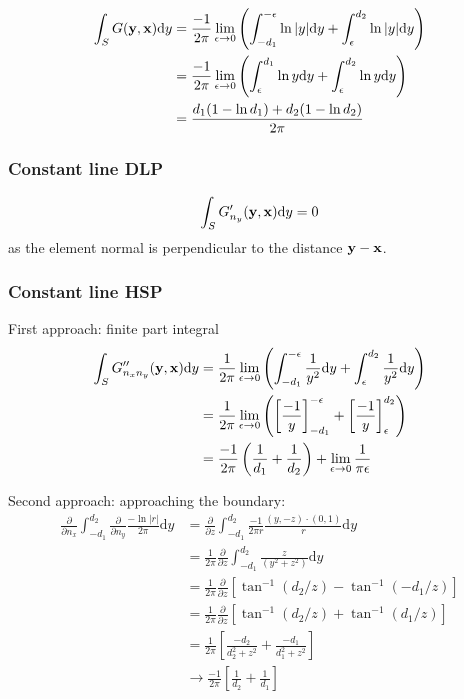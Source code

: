 \documentclass[a4paper,11pt]{article}
\newcommand{\td}{\mathrm{d}}
\begin{document}
\begin{align}
\int_{S} G({\bf y}, {\bf x}) \td y
& = \frac{-1}{2\pi}\lim_{\epsilon \to 0}
\left( \int_{-d_1}^{-\epsilon} \ln |y| \td y + \int_{\epsilon}^{d_2}  \ln |y| \td y \right) \nonumber \\
& = \frac{-1}{2\pi}\lim_{\epsilon \to 0}
\left( \int_{\epsilon}^{d_1} \ln y \td y + \int_{\epsilon}^{d_2}  \ln y \td y \right) \nonumber \\
&=
\frac{d_1(1-\ln d_1) + d_2(1-\ln d_2)}{2\pi}
\end{align}

\subsubsection{Constant line DLP}

\begin{equation}
\int_{S} G'_{n_y}({\bf y}, {\bf x}) \td y = 0
\end{equation}
%
as the element normal is perpendicular to the distance ${\bf y}-{\bf x}$.

\subsubsection{Constant line HSP}

First approach: finite part integral
%
\begin{align}
\int_{S} G''_{n_x n_y}({\bf y}, {\bf x}) \td y
&= \frac{1}{2\pi} \lim_{\epsilon \to 0} \left(\int_{-d_1}^{-\epsilon} \frac{1}{y^2}\td y + \int_{\epsilon}^{d_2} \frac{1}{y^2} \td y\right) \nonumber \\
&= \frac{1}{2\pi} \lim_{\epsilon \to 0} \left(\left[\frac{-1}{y}\right]_{-d_1}^{-\epsilon} +  \left[\frac{-1}{y}\right]_{\epsilon}^{d_2} \right)
\nonumber \\
&= \frac{-1}{2\pi} \left(\frac{1}{d_1} +  \frac{1}{d_2} \right) + \lim_{\epsilon \to 0} \frac{1}{\pi\epsilon}
\end{align}


Second approach: approaching the boundary:
%
\begin{align}
\frac{\partial}{\partial n_x}
\int_{-d_1}^{d_2} 
\frac{\partial}{\partial n_y}
\frac{-\ln |r|}{2\pi}
\td y 
&=
\frac{\partial}{\partial z}
\int_{-d_1}^{d_2} 
\frac{-1}{2\pi r} \frac{(y, -z) \cdot (0,1)}{r}
\td y \nonumber \\
&=
\frac{1}{2\pi} \frac{\partial}{\partial z}
\int_{-d_1}^{d_2} 
\frac{z}{\left(y^2+z^2\right)}
\td y \nonumber \\
&=
\frac{1}{2\pi} \frac{\partial}{\partial z}
\left[
\tan^{-1}\left(d_2/z\right)
-
\tan^{-1}\left(-d_1/z\right)
\right]
\nonumber \\
&=
\frac{1}{2\pi} \frac{\partial}{\partial z}
\left[
\tan^{-1}\left(d_2/z\right) + \tan^{-1}\left(d_1/z\right)
\right]
\nonumber \\
&=
\frac{1}{2\pi} 
\left[
\frac{-d_2}{d_2^2+z^2} + \frac{-d_1}{d_1^2+z^2}
\right]
\nonumber \\
& \to
\frac{-1}{2\pi} 
\left[
\frac{1}{d_2} + \frac{1}{d_1}
\right]
\end{align}
\end{document}

